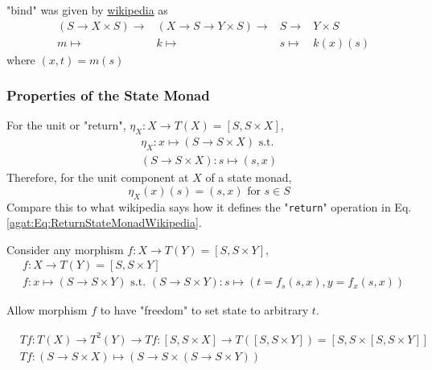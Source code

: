 "bind" was given by \href{https://en.wikipedia.org/wiki/Monad_(functional_programming)#State_monads}{wikipedia} as 
\begin{equation}\label{agat:Eq:BindStateMonadWikipedia}
\begin{aligned} 
	& (S \to X \times S)  \to & (X \to S \to Y \times S) \to & S \to & Y \times S \\ 
	& m \mapsto & k \mapsto & s \mapsto & k(x)(s) 
\end{aligned} 
\end{equation}
where $(x, t) = m(s)$

\subsubsection{Properties of the State Monad}

For the unit or "return", $\eta_X : X \to T(X) = [S, S \times X]$, \\

\begin{equation}
\begin{gathered} 
\eta_X : x \mapsto (S \to S \times X) \text{ s.t. } \\
(S \to S \times X) : s \mapsto (s, x)
\end{gathered} 
\end{equation}
Therefore, for the unit component at $X$ of a state monad,
\begin{equation}
\boxed{ \eta_X(x)(s) = (s, x) \text{ for } s \in S }
\end{equation}
Compare this to what wikipedia says how it defines the "\texttt{return}" operation in Eq. \ref{agat:Eq:ReturnStateMonadWikipedia}.

Consider any morphism $f : X \to T(Y) = [S, S\times Y]$,
\begin{equation}
\begin{aligned}
& f : X \to T(Y) = [S, S\times Y] \\
& f:x \mapsto (S \to S\times Y) \text{ s.t. } (S \to S \times Y) : s \mapsto (t = f_s(s, x), y = f_x(s, x))
\end{aligned}
\end{equation}

Allow morphism $f$ to have "freedom" to set state to arbitrary $t$.

\begin{equation}
\begin{aligned}
& Tf:T(X) \to T^2(Y) \to Tf : [S, S\times X] \to T([S, S\times Y]) = [S, S \times [S, S\times Y]] \\
& Tf:(S \to S \times X) \mapsto (S \to S \times (S \to S \times Y))
\end{aligned}
\end{equation}

